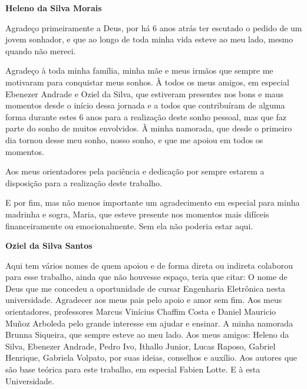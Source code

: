 \begin{agradecimentos}
   \textbf{Heleno da Silva Morais}
	\vspace*{\fill}
	\begin{flushleft}
	Agradeço primeiramente a Deus, por há 6 anos atrás ter escutado o pedido de um jovem sonhador, e que ao longo de toda minha vida esteve ao meu lado, mesmo quando não mereci.
	
	Agradeço à toda minha família, minha mãe e meus irmãos que sempre me motivaram para conquistar meus sonhos. À todos os meus amigos, em especial Ebenezer Andrade e Oziel da Silva, que estiveram presentes nos bons e maus momentos desde o início dessa jornada e a todos que contribuíram de alguma forma durante estes 6 anos para a realização deste sonho pessoal, mas que faz parte do sonho de muitos envolvidos. À minha namorada, que desde o primeiro dia tornou desse meu sonho, nosso sonho, e que me apoiou em todos os momentos.
	
	Aos meus orientadores pela paciência e dedicação por sempre estarem a disposição para a realização deste trabalho.
	
	E por fim, mas não menos importante um agradecimento em especial para minha madrinha e sogra, Maria, que esteve presente nos momentos mais difíceis financeiramente ou emocionalmente. Sem ela não poderia estar aqui.
\end{flushleft}
\vspace*{\fill}

\pagebreak

\textbf{Oziel da Silva Santos}

\vspace*{\fill}
\begin{flushleft}

Aqui tem vários nomes de quem apoiou e de forma direta ou indireta colaborou para esse trabalho, ainda que não houvesse espaço,
teria que citar:
O nome de Deus que me concedeu a oportunidade de cursar Engenharia Eletrônica nesta universidade. 
Agradecer aos meus pais pelo apoio e amor sem fim.
Aos meus orientadores, professores  Marcus Vinícius Chaffim Costa e Daniel Mauricio Muñoz Arboleda pelo grande interesse em ajudar e ensinar.
A minha namorada Brunna Siqueira, que sempre esteve ao meu lado.
Aos meus amigos: Heleno da Silva, Ebenezer Andrade, Pedro Ivo, Ithallo Junior, Lucas Raposo, Gabriel Henrique, Gabriela Volpato, por suas ideias, conselhos e auxílio.
Aos autores que são base teórica para este trabalho, em especial Fabien Lotte.
E à esta Universidade.


\end{flushleft}
\vspace*{\fill}
\end{agradecimentos}
